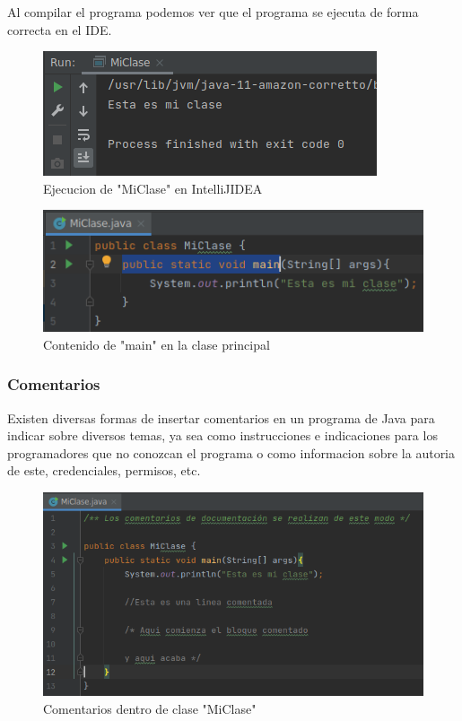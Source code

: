 \documentclass{article}
\begin{document}
		Al compilar el programa podemos ver que el programa se ejecuta de forma correcta en el IDE.
		
		\begin{figure}[H]
			\centering
			\includegraphics[scale = 1]{images/miclase2}
			\caption{Ejecucion de "MiClase" en IntelliJIDEA}
		\end{figure} 
		
		\begin{figure}[H]
			\centering
			\includegraphics[scale = 0.8]{images/miclasemain}
			\caption{Contenido de "main" en la clase principal}
		\end{figure} 
	
		\subsubsection{Comentarios}
		
		Existen diversas formas de insertar comentarios en un programa de Java para indicar sobre diversos temas, ya sea como instrucciones e indicaciones para los programadores que no conozcan el programa o como informacion sobre la autoria de este, credenciales, permisos, etc.
		
		\begin{figure}[H]
			\centering
			\includegraphics[scale = 0.6]{images/miclasecoments}
			\caption{Comentarios dentro de clase "MiClase"}
		\end{figure} 
		\newpage
	
\end{document}
